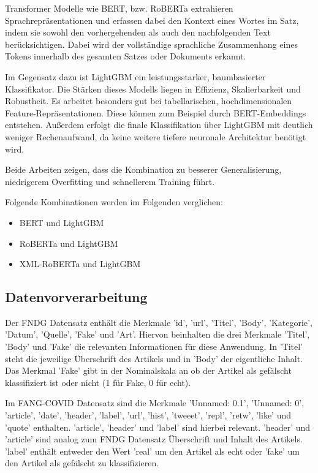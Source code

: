 Transformer Modelle wie BERT, bzw. RoBERTa extrahieren Sprachrepräsentationen und erfassen dabei den Kontext
eines Wortes im Satz, indem sie sowohl den vorhergehenden als auch den nachfolgenden Text berücksichtigen.
Dabei wird der vollständige sprachliche Zusammenhang eines Tokens innerhalb des gesamten Satzes oder Dokuments erkannt.

Im Gegensatz dazu ist LightGBM ein leistungsstarker, baumbasierter Klassifikator. Die Stärken dieses Modells liegen in Effizienz, Skalierbarkeit und Robustheit.
Es arbeitet besonders gut bei tabellarischen, hochdimensionalen Feature-Repräsentationen. 
Diese können zum Beispiel durch BERT-Embeddings entstehen.
Außerdem erfolgt die finale Klassifikation über LightGBM mit deutlich weniger Rechenaufwand, da keine weitere tiefere neuronale Architektur benötigt wird.

Beide Arbeiten zeigen, dass die Kombination zu besserer Generalisierung, niedrigerem Overfitting und schnellerem Training führt.

Folgende Kombinationen werden im Folgenden verglichen:
\begin{itemize}
    \item BERT und LightGBM
    \item RoBERTa und LightGBM
    \item XML-RoBERTa und LightGBM
\end{itemize}

\subsection{Datenvorverarbeitung} \label{sec6:datenvorverarbeitung}

Der FNDG Datensatz enthält die Merkmale 'id', 'url', 'Titel', 'Body', 'Kategorie', 'Datum', 'Quelle', 'Fake' und 'Art'.
Hiervon beinhalten die drei Merkmale 'Titel', 'Body' und 'Fake' die relevanten Informationen für diese Anwendung.
In 'Titel' steht die jeweilige Überschrift des Artikels und in 'Body' der eigentliche Inhalt. Das Merkmal 'Fake' gibt in der Nominalskala
an ob der Artikel als gefälscht klassifiziert ist oder nicht (1 für Fake, 0 für echt).

Im FANG-COVID Datensatz sind die Merkmale 'Unnamed: 0.1', 'Unnamed: 0', 'article', 'date', 'header', 'label', 'url', 'hist', 'tweeet', 'repl', 'retw', 'like' und 'quote'
enthalten. 'article', 'header' und 'label' sind hierbei relevant. 'header' und 'article' sind analog zum FNDG Datensatz Überschrift und Inhalt
des Artikels. 'label' enthält entweder den Wert 'real' um den Artikel als echt oder 'fake' um den Artikel als gefälscht zu klassifizieren.

